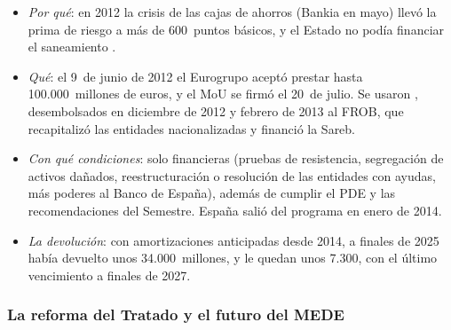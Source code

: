 \documentclass[11pt]{article}
\begin{document}
\begin{itemize}
\item \emph{Por qué}: en 2012 la crisis de las cajas de ahorros (Bankia en mayo) llevó la prima de riesgo a más de 600~puntos básicos, y el Estado no podía financiar el saneamiento .
\item \emph{Qué}: el 9~de junio de 2012 el Eurogrupo aceptó prestar hasta 100.000~millones de euros, y el MoU se firmó el 20~de julio. Se usaron , desembolsados en diciembre de 2012 y febrero de 2013 al FROB, que recapitalizó las entidades nacionalizadas y financió la Sareb\nocite{MEDE2026Espana}.
\item \emph{Con qué condiciones}: solo financieras (pruebas de resistencia, segregación de activos dañados, reestructuración o resolución de las entidades con ayudas, más poderes al Banco de España), además de cumplir el PDE y las recomendaciones del Semestre. España salió del programa en enero de 2014.
\item \emph{La devolución}: con amortizaciones anticipadas desde 2014, a finales de 2025 había devuelto unos 34.000~millones, y le quedan unos 7.300, con el último vencimiento a finales de 2027\nocite{MEDE2026Espana}.
\end{itemize}

\subsubsection{La reforma del Tratado y el futuro del MEDE}\label{sec:mede-reforma}
\end{document}

